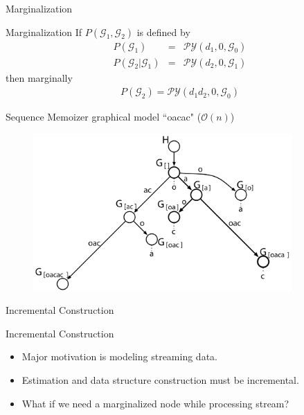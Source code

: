 \documentclass{beamer}
\newcommand{\G}{\mathcal{G}}
\newcommand{\PY}{\mathcal{P}\mathcal{Y}}
\begin{document}
\begin{frame}[t]{Marginalization}
	\begin{block}{Marginalization \cite{Pitman1999}}
		If $P(\G_1, \G_2)$ is defined by
		\begin{eqnarray*}
			P(\G_1) &=&  \PY(d_1, 0, \G_0) \\
			P(\G_2 | \G_1) &=& \PY(d_2, 0, \G_1)
		\end{eqnarray*}
		then marginally 
		\begin{eqnarray*}
			P(\G_2) =  \PY(d_1 d_2, 0, \G_0)
		\end{eqnarray*}
	\end{block}	
\end{frame}

\begin{frame}[t]{Sequence Memoizer graphical model ``oacac" ($\mathcal{O}(n)$) \cite{Wood2009}}

	\begin{figure}[t]
		\begin{center}
			\includegraphics[height = 6cm]{../figs/prefix_tree_not_coloured.pdf}
		\end{center}
	\end{figure}
	
\end{frame}

\begin{frame}[t]{Incremental Construction}
	\begin{block}{Incremental Construction}
		\begin{itemize}
			\item Major motivation is modeling streaming data.
			\item Estimation and data structure construction must be incremental.
			\item What if we need a marginalized node while processing stream?
		\end{itemize}
	\end{block}
\end{frame}
\end{document}
